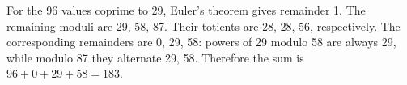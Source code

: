 For the 96 values coprime to 29, Euler's theorem gives remainder 1. The remaining moduli are 29, 58, 87. Their totients are 28, 28, 56, respectively. The corresponding remainders are 0, 29, 58: powers of 29 modulo 58 are always 29, while modulo 87 they alternate 29, 58. Therefore the sum is $96+0+29+58=\boxed{183}$.
